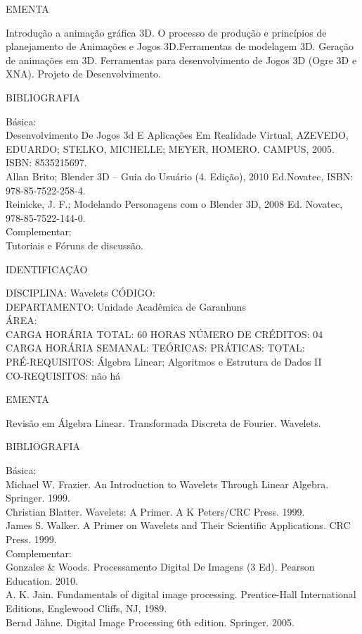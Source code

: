 \documentclass[
	12pt,				%
	openright,			%
  oneside,     %
	a4paper,			%
	english,			%
	french,				%
	spanish,			%
	brazil				%
	]{abntex2}
\begin{document}
\begin{apendicesenv}
EMENTA 

Introdução a animação gráfica 3D. O processo de produção e princípios de
planejamento de Animações e Jogos 3D.Ferramentas de modelagem 3D.
Geração de animações em 3D. Ferramentas para desenvolvimento de Jogos
3D (Ogre 3D e XNA). Projeto de Desenvolvimento.

BIBLIOGRAFIA 

Básica:\\
Desenvolvimento De Jogos 3d E Aplicações Em Realidade Virtual, AZEVEDO,
EDUARDO; STELKO, MICHELLE; MEYER, HOMERO. CAMPUS, 2005. ISBN:
8535215697.\\
Allan Brito; Blender 3D -- Guia do Usuário (4. Edição), 2010 Ed.Novatec,
ISBN: 978-85-7522-258-4.\\
Reinicke, J. F.; Modelando Personagens com o Blender 3D, 2008 Ed.
Novatec, 978-85-7522-144-0. \\
Complementar:\\
Tutoriais e Fóruns de discussão.

\newpage IDENTIFICAÇÃO

DISCIPLINA: Wavelets CÓDIGO:\\ 
DEPARTAMENTO: Unidade Acadêmica de Garanhuns\\ ÁREA: \\
CARGA HORÁRIA TOTAL: 60 HORAS NÚMERO DE CRÉDITOS: 04\\
CARGA HORÁRIA SEMANAL: TEÓRICAS: PRÁTICAS: TOTAL: \\
PRÉ-REQUISITOS: Álgebra Linear; Algoritmos e Estrutura de Dados II
\\CO-REQUISITOS: não há

EMENTA 

Revisão em Álgebra Linear. Transformada Discreta de Fourier. Wavelets.

BIBLIOGRAFIA 

Básica:\\
Michael W. Frazier. An Introduction to Wavelets Through Linear Algebra.
Springer. 1999.\\
Christian Blatter. Wavelets: A Primer. A K Peters/CRC Press. 1999.\\
James S. Walker. A Primer on Wavelets and Their Scientific Applications.
CRC Press. 1999.\\
Complementar:\\
Gonzales \& Woods. Processamento Digital De Imagens (3 Ed). Pearson
Education. 2010. \\
A. K. Jain. Fundamentals of digital image processing. Prentice-Hall
International Editions, Englewood Cliffs, NJ, 1989.\\
Bernd Jähne. Digital Image Processing 6th edition. Springer. 2005.


\end{apendicesenv}
\end{document}
